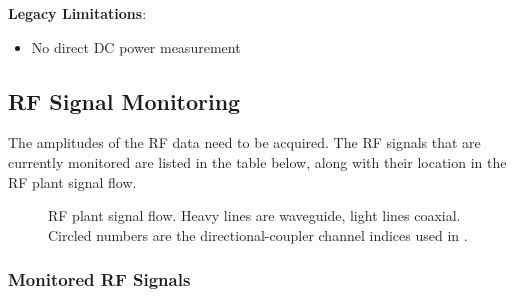 {\textbf{Legacy Limitations}:

\begin{itemize}
\tightlist
\item
  No direct DC power measurement
\end{itemize}

\subsection{RF Signal Monitoring}\label{rf-signal-monitoring}

The amplitudes of the RF data need to be acquired. The RF signals that are currently monitored are listed in the table below, along with their location in the RF plant signal flow.

\begin{figure}[tbp]
\centering
\begin{fitpicture}\end{fitpicture}
\caption{RF plant signal flow.  Heavy lines are waveguide, light lines coaxial.  Circled numbers are the directional-coupler channel indices used in .}\label{fig:rf-signal-flow}
\end{figure}
\subsubsection{Monitored RF Signals}\label{monitored-rf-signals}

}
